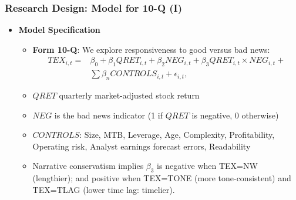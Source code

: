 \documentclass{beamer}
\begin{document}
\begin{frame}
\frametitle{Research Design: Model for 10-Q (I)}
\begin{itemize}
	
	\item \textbf{Model Specification}
	\begin{itemize}
		\item \textbf{Form 10-Q}: We explore  responsiveness to good versus bad news: 
		\begin{equation}
		\begin{aligned} 
		\label{eq1}
		TEX_{i,t}=
		&\beta_0+\beta_1QRET_{i,t}+\beta_2NEG_{i,t}+\beta_3QRET_{i,t}\times NEG_{i,t}+\\
		&\sum\beta_nCONTROLS_{i,t}+\epsilon_{i,t},
		\end{aligned} 
		\end{equation}
		
		
		
		\item $QRET$ quarterly market-adjusted stock return
		\item $NEG$ is the bad news indicator (1 if $QRET$ is negative, 0 otherwise)
		\item $CONTROLS$: Size, MTB, Leverage, Age, Complexity, Profitability, Operating risk, Analyst earnings forecast errors, Readability  
		\pause \medskip
		
		\item Narrative conservatism implies $\beta_3$ is negative when TEX=NW (lengthier); and positive when TEX=TONE (more tone-consistent) and TEX=TLAG (lower time lag: timelier).
	\end{itemize}
\end{itemize}
\end{frame}
\end{document}
